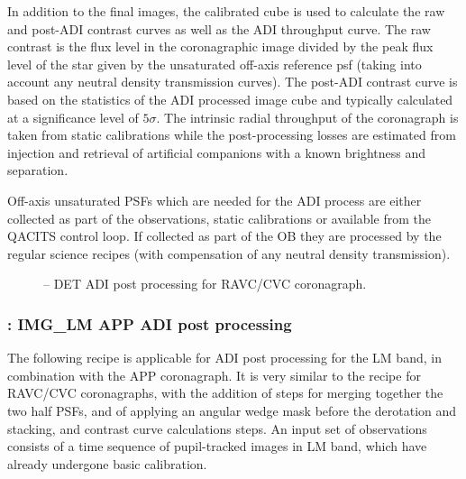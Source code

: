 In addition to the final images, the calibrated cube is used to calculate the raw and post-ADI contrast curves as
well as the ADI throughput curve. The raw contrast is the flux level in the coronagraphic image divided by the peak flux level of the star given by the unsaturated off-axis reference psf (taking into account any neutral density transmission curves). The post-ADI contrast curve is based on the statistics of the ADI processed image cube and typically calculated at a significance level of $5\sigma$. The intrinsic radial throughput of
the coronagraph is taken from static calibrations while the
post-processing losses are estimated from injection and retrieval of
artificial companions with a known brightness and separation.

Off-axis unsaturated PSFs which are needed for the ADI process are
either collected as part of the observations, static calibrations or
available from the QACITS control loop.  If collected as part of the
OB they are processed by the regular science recipes (with
compensation of any neutral density transmission). 



\label{rec:metis_img_adi_cgrph}

\begin{figure}[hb]
  \centering
  \def \globalscale {0.400000}
  \fontsize{10}{12}\selectfont
  
  \caption[Recipe: ]{ -- DET ADI post processing for RAVC/CVC coronagraph.
    }
  \label{fig:metis_det_adi_ravc}
\end{figure}
\restoregeometry

\subsubsection{: IMG\_LM APP ADI post processing}
\label{sssec:adi_img_app}


The following recipe is applicable for ADI post processing for the LM
band, in combination with the APP coronagraph. It is very
similar to the recipe for RAVC/CVC coronagraphs, with the
addition of steps for merging together the two half PSFs, and of
applying an angular wedge mask before the derotation and stacking, and
contrast curve calculations steps. An input set of observations
consists of a time sequence of pupil-tracked images in LM band, which have
already undergone basic calibration.

